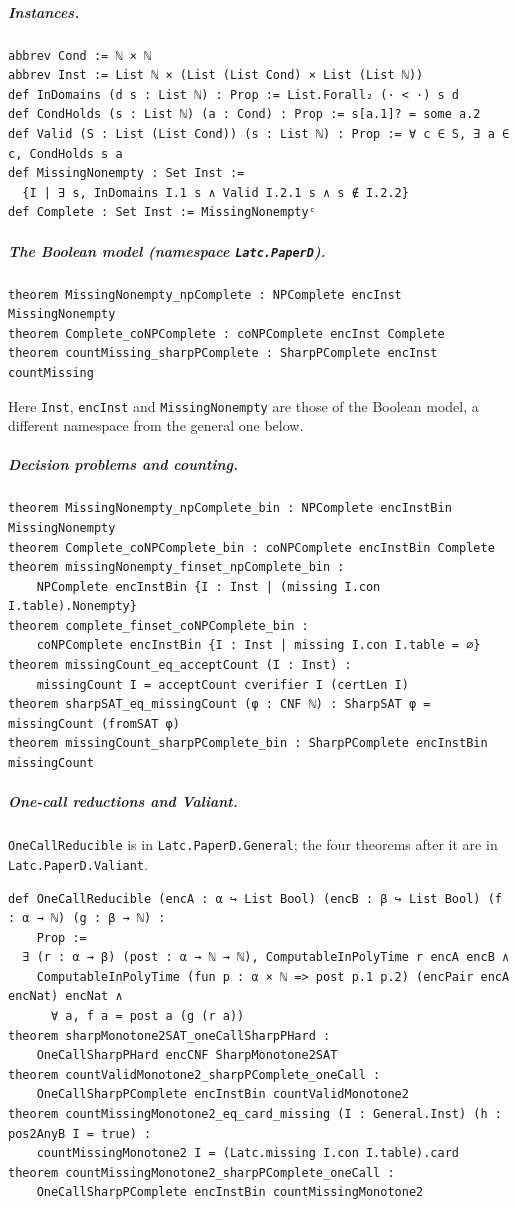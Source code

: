 \documentclass[a4paper,UKenglish,cleveref,autoref,thm-restate]{lipics-v2021}
\begin{document}
\subparagraph*{Instances.}
\begin{lstlisting}
abbrev Cond := ℕ × ℕ
abbrev Inst := List ℕ × (List (List Cond) × List (List ℕ))
def InDomains (d s : List ℕ) : Prop := List.Forall₂ (· < ·) s d
def CondHolds (s : List ℕ) (a : Cond) : Prop := s[a.1]? = some a.2
def Valid (S : List (List Cond)) (s : List ℕ) : Prop := ∀ c ∈ S, ∃ a ∈ c, CondHolds s a
def MissingNonempty : Set Inst :=
  {I | ∃ s, InDomains I.1 s ∧ Valid I.2.1 s ∧ s ∉ I.2.2}
def Complete : Set Inst := MissingNonemptyᶜ
\end{lstlisting}

\subparagraph*{The Boolean model (namespace \lstinline{Latc.PaperD}).}
\begin{lstlisting}
theorem MissingNonempty_npComplete : NPComplete encInst MissingNonempty
theorem Complete_coNPComplete : coNPComplete encInst Complete
theorem countMissing_sharpPComplete : SharpPComplete encInst countMissing
\end{lstlisting}
Here \lstinline{Inst}, \lstinline{encInst} and \lstinline{MissingNonempty} are those of the
Boolean model, a different namespace from the general one below.

\subparagraph*{Decision problems and counting.}
\begin{lstlisting}
theorem MissingNonempty_npComplete_bin : NPComplete encInstBin MissingNonempty
theorem Complete_coNPComplete_bin : coNPComplete encInstBin Complete
theorem missingNonempty_finset_npComplete_bin :
    NPComplete encInstBin {I : Inst | (missing I.con I.table).Nonempty}
theorem complete_finset_coNPComplete_bin :
    coNPComplete encInstBin {I : Inst | missing I.con I.table = ∅}
theorem missingCount_eq_acceptCount (I : Inst) :
    missingCount I = acceptCount cverifier I (certLen I)
theorem sharpSAT_eq_missingCount (φ : CNF ℕ) : SharpSAT φ = missingCount (fromSAT φ)
theorem missingCount_sharpPComplete_bin : SharpPComplete encInstBin missingCount
\end{lstlisting}

\subparagraph*{One-call reductions and Valiant.}
\lstinline{OneCallReducible} is in \lstinline{Latc.PaperD.General}; the four theorems after it are in
\lstinline{Latc.PaperD.Valiant}.
\begin{lstlisting}
def OneCallReducible (encA : α ↪ List Bool) (encB : β ↪ List Bool) (f : α → ℕ) (g : β → ℕ) :
    Prop :=
  ∃ (r : α → β) (post : α → ℕ → ℕ), ComputableInPolyTime r encA encB ∧
    ComputableInPolyTime (fun p : α × ℕ => post p.1 p.2) (encPair encA encNat) encNat ∧
      ∀ a, f a = post a (g (r a))
theorem sharpMonotone2SAT_oneCallSharpPHard :
    OneCallSharpPHard encCNF SharpMonotone2SAT
theorem countValidMonotone2_sharpPComplete_oneCall :
    OneCallSharpPComplete encInstBin countValidMonotone2
theorem countMissingMonotone2_eq_card_missing (I : General.Inst) (h : pos2AnyB I = true) :
    countMissingMonotone2 I = (Latc.missing I.con I.table).card
theorem countMissingMonotone2_sharpPComplete_oneCall :
    OneCallSharpPComplete encInstBin countMissingMonotone2
\end{lstlisting}
\end{document}
